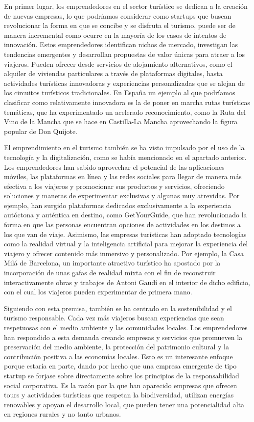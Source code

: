 \documentclass[
  letterpaper,
  DIV=11,
  numbers=noendperiod]{scrreprt}
\begin{document}
En primer lugar, los emprendedores en el sector turístico se dedican a
la creación de nuevas empresas, lo que podríamos considerar como
startups que buscan revolucionar la forma en que se concibe y se
disfruta el turismo, puede ser de manera incremental como ocurre en la
mayoría de los casos de intentos de innovación. Estos emprendedores
identifican nichos de mercado, investigan las tendencias emergentes y
desarrollan propuestas de valor únicas para atraer a los viajeros.
Pueden ofrecer desde servicios de alojamiento alternativos, como el
alquiler de viviendas particulares a través de plataformas digitales,
hasta actividades turísticas innovadoras y experiencias personalizadas
que se alejan de los circuitos turísticos tradicionales. En España un
ejemplo al que podríamos clasificar como relativamente innovadora es la
de poner en marcha rutas turísticas temáticas, que ha experimentado un
acelerado reconocimiento, como la Ruta del Vino de la Mancha que se hace
en Castilla-La Mancha aprovechando la figura popular de Don Quijote.

El emprendimiento en el turismo también se ha visto impulsado por el uso
de la tecnología y la digitalización, como se había mencionado en el
apartado anterior. Los emprendedores han sabido aprovechar el potencial
de las aplicaciones móviles, las plataformas en línea y las redes
sociales para llegar de manera más efectiva a los viajeros y promocionar
sus productos y servicios, ofreciendo soluciones y maneras de
experimentar exclusivas y algunas muy atrevidas. Por ejemplo, han
surgido plataformas dedicados exclusivamente a la experiencia autóctona
y auténtica en destino, como GetYourGuide, que han revolucionado la
forma en que las personas encuentran opciones de actividades en los
destinos a los que van de viaje. Asimismo, las empresas turísticas han
adoptado tecnologías como la realidad virtual y la inteligencia
artificial para mejorar la experiencia del viajero y ofrecer contenido
más inmersivo y personalizado. Por ejemplo, la Casa Milá de Barcelona,
un importante atractivo turístico ha apostado por la incorporación de
unas gafas de realidad mixta con el fin de reconstruir interactivamente
obras y trabajos de Antoni Gaudí en el interior de dicho edificio, con
el cual los viajeros pueden experimentar de primera mano.

Siguiendo con esta premisa, también se ha centrado en la sostenibilidad
y el turismo responsable. Cada vez más viajeros buscan experiencias que
sean respetuosas con el medio ambiente y las comunidades locales. Los
emprendedores han respondido a esta demanda creando empresas y servicios
que promueven la preservación del medio ambiente, la protección del
patrimonio cultural y la contribución positiva a las economías locales.
Esto es un interesante enfoque porque estaría en parte, dando por hecho
que una empresa emergente de tipo startup se forjase sobre directamente
sobre los principios de la responsabilidad social corporativa. Es la
razón por la que han aparecido empresas que ofrecen tours y actividades
turísticas que respetan la biodiversidad, utilizan energías renovables y
apoyan el desarrollo local, que pueden tener una potencialidad alta en
regiones rurales y no tanto urbanos.
\end{document}
